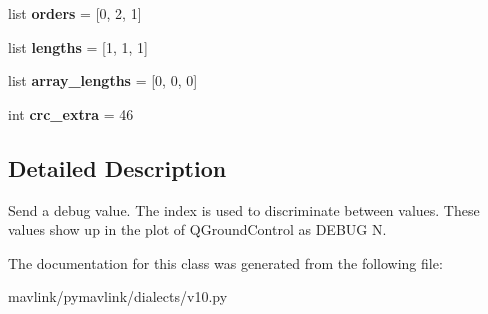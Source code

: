 \begin{DoxyCompactItemize}
\item 
\mbox{\label{classpymavlink_1_1dialects_1_1v10_1_1MAVLink__debug__message_ab8035bb97a65697326ac1e0c854d6b8e}} 
list {\bfseries orders} = \mbox{[}0, 2, 1\mbox{]}
\item 
\mbox{\label{classpymavlink_1_1dialects_1_1v10_1_1MAVLink__debug__message_a138964b47b88aaa0ca6b6d75c4918a61}} 
list {\bfseries lengths} = \mbox{[}1, 1, 1\mbox{]}
\item 
\mbox{\label{classpymavlink_1_1dialects_1_1v10_1_1MAVLink__debug__message_a4d4086bd0716ad5eb2311cb4c6a25f33}} 
list {\bfseries array\+\_\+lengths} = \mbox{[}0, 0, 0\mbox{]}
\item 
\mbox{\label{classpymavlink_1_1dialects_1_1v10_1_1MAVLink__debug__message_ab82e6426415926b3d6f6b3f6a4ce47aa}} 
int {\bfseries crc\+\_\+extra} = 46
\end{DoxyCompactItemize}


\subsection{Detailed Description}
\begin{DoxyVerb}Send a debug value. The index is used to discriminate between
values. These values show up in the plot of QGroundControl as
DEBUG N.
\end{DoxyVerb}
 

The documentation for this class was generated from the following file\+:\begin{DoxyCompactItemize}
\item 
mavlink/pymavlink/dialects/v10.\+py\end{DoxyCompactItemize}
